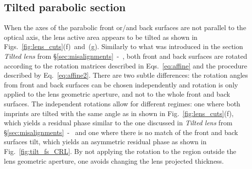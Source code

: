 \begin{refsection}
\subsection{Tilted parabolic section}

When the axes of the parabolic front or/and back surfaces are not parallel to the optical axis, the lens active area appears to be tilted as shown in Figs.~\ref{fig:lens_cuts}(f)~and~(g). Similarly to what was introduced in the section \textit{Tilted lens} from \S\ref{sec:misalignments}~-~\textit{}, both front and back surfaces are rotated according to the rotation matrices described in Eqs.~\ref{eq:affine} and the procedure described by Eq.~\ref{eq:affine2}. There are two subtle differences: the rotation angles from front and back surfaces can be chosen independently and rotation is only applied to the lens geometric aperture, and not to the whole front and back surfaces. The independent rotations allow for different regimes: one where both imprints are tilted with the same angle as in shown in Fig.~\ref{fig:lens_cuts}(f), which yields a residual phase similar to the one discussed in \textit{Tilted lens} from \S\ref{sec:misalignments}~-~\textit{} and  one where there is no match of the front and back surfaces tilt, which yields an asymmetric residual phase as shown in Fig.~\ref{fig:tilt_fs_CRL}. By not applying the rotation to the region outside the lens geometric aperture, one avoids changing the lens projected thickness.


\end{refsection}
